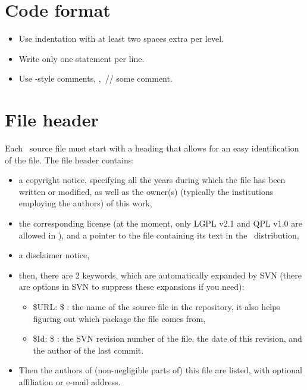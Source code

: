 \section{Code format\label{sec:code_format}}

\begin{itemize}
\item Use indentation with at least two spaces extra per level.%
\item Write only one statement per line.
\item Use \CC-style comments, \eg,~{\ccFont // some comment}.%
\end{itemize}


\section{File header\label{sec:file_header}}

Each \cgal\ source file must start with a heading that allows for an easy
identification of the file.  The file header contains:
\begin{itemize}
\item a copyright notice, specifying all the years during which the file has
been written or modified, as well as the owner(s) (typically the institutions
employing the authors) of this work,
\item the corresponding license (at the moment, only LGPL v2.1 and QPL v1.0
are allowed in \cgal), and a pointer to the file containing its text in the
\cgal\ distribution,
\item a disclaimer notice,
\item then, there are 2 keywords, which are automatically expanded by SVN
(there are options in SVN to suppress these expansions if you need):
\begin{itemize}
\item \${}URL: \$ : the name of the source file in the repository, it also
helps figuring out which package the file comes from,
\item \${}Id: \$ : the SVN revision number of the file, the date of this revision,
and the author of the last commit.
\end{itemize}
\item Then the authors of (non-negligible parts of) this file are listed, with
optional affiliation or e-mail address.
\end{itemize}

